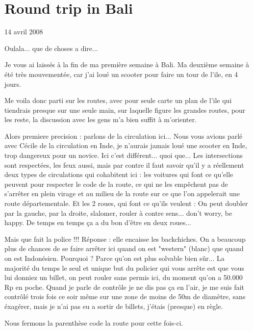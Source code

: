 \section{Round trip in Bali}

14 avril 2008

\begin{multicols}{2}

Oulala... que de choses a dire...

Je vous ai laissés à la fin de ma première semaine à Bali. Ma deuxième semaine à été très mouvementée, car j'ai loué un scooter pour faire un tour de l'ile, en 4 jours.

Me voila donc parti sur les routes, avec pour seule carte un plan de l'ile qui tiendrais presque sur une seule main, sur laquelle figure les grandes routes, pour les reste, la discussion avec les gens m'a bien suffit à m'orienter.

Alors premiere precision : parlons de la circulation ici... Nous vous avions parlé avec Cécile de la circulation en Inde, je n'aurais jamais loué une scooter en Inde, trop dangereux pour un novice. Ici c'est différent... quoi que... Les intersections sont respectées, les feux aussi, mais par contre il faut savoir qu'il y a réellement deux types de circulations qui cohabitent ici : les voitures qui font ce qu'elle peuvent pour respecter le code de la route, ce qui ne les empêchent pas de s'arrêter en plein virage et au milieu de la route sur ce que l'on appelerait une route départementale. Et les 2 roues, qui font ce qu'ils veulent : On peut doubler par la gauche, par la droite, slalomer, rouler à contre sens... don't worry, be happy. De temps en temps ça a du bon d'être en deux roues...

Mais que fait la police !!! Réponse : elle encaisse les backchiches. On a beaucoup plus de chances de se faire arrêter ici quand on est "western" (blanc) que quand on est Indonésien. Pourquoi ? Parce qu'on est plus solvable bien sûr... La majorité du temps le seul et unique but du policier qui vous arrête est que vous lui donniez un billet, on peut rouler sans permis ici, du moment qu'on a 50.000 Rp en poche. Quand je parle de contrôle je ne dis pas ça en l'air, je me suis fait contrôlé trois fois ce soir même sur une zone de moins de 50m de diamètre, sans éxagérer, mais je n'ai pas eu a sortir de billets, j'étais (presque) en règle.

Nous fermons la parenthèse code la route pour cette fois-ci.




\end{multicols}
